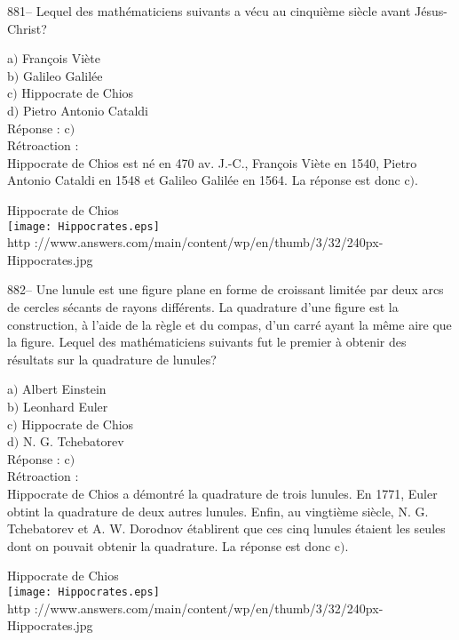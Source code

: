 ﻿\documentclass[letterpaper, 12pt]{article}
\begin{document}
881-- Lequel des math\'ematiciens suivants a v\'ecu au cinqui\`eme
si\`ecle avant J\'esus-Christ?

a$)$ Fran\c cois Vi\`ete \\
b$)$ Galileo Galil\'ee \\
c$)$ Hippocrate de Chios \\
d$)$ Pietro Antonio Cataldi\\

R\'eponse : c$)$\\

R\'etroaction : \\
Hippocrate de Chios est n\'e en 470 av. J.-C., Fran\c cois Vi\`ete
en 1540,
Pietro Antonio Cataldi en 1548 et Galileo Galil\'ee en 1564. La r\'eponse
est donc c$)$.\\

        \begin{center}
        Hippocrate de Chios\\
    \texttt{[image: Hippocrates.eps]}\\
        {\footnotesize http
://www.answers.com/main/content/wp/en/thumb/3/32/240px-Hippocrates.jpg}
    \end{center}

882-- Une lunule est une figure plane en forme de croissant
limit\'ee par deux arcs de cercles s\'ecants de rayons diff\'erents.
La quadrature d'une figure est la construction, \`a l'aide de la
r\`egle et du compas, d'un carr\'e ayant la m\^eme aire que la
figure. Lequel des math\'ematiciens suivants fut le premier \`a
obtenir des r\'esultats sur la quadrature de lunules?

a$)$ Albert Einstein \\
b$)$ Leonhard Euler \\
c$)$ Hippocrate de Chios \\
d$)$ N. G. Tchebatorev \\

R\'eponse : c$)$\\

R\'etroaction : \\
Hippocrate de Chios a d\'emontr\'e la quadrature de trois lunules. En 1771,
Euler obtint la quadrature de deux autres lunules. Enfin, au vingti\`eme
si\`ecle, N. G. Tchebatorev et
A. W. Dorodnov \'etablirent que ces cinq lunules \'etaient les seules dont
on pouvait obtenir la quadrature. La r\'eponse est donc c$)$.\\

        \begin{center}
        Hippocrate de Chios\\
    \texttt{[image: Hippocrates.eps]}\\
        {\footnotesize http
://www.answers.com/main/content/wp/en/thumb/3/32/240px-Hippocrates.jpg}
    \end{center}
\end{document}
